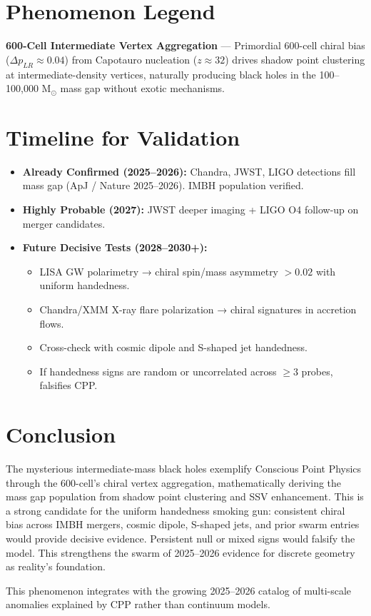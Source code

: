 \documentclass[11pt]{article}
\begin{document}
\section{Phenomenon Legend}
\textbf{600-Cell Intermediate Vertex Aggregation} — Primordial 600-cell chiral bias ($\Delta p_{LR} \approx 0.04$) from Capotauro nucleation ($z \approx 32$) drives shadow point clustering at intermediate-density vertices, naturally producing black holes in the 100–100,000 M$_\odot$ mass gap without exotic mechanisms.

\section{Timeline for Validation}
\begin{itemize}
    \item \textbf{Already Confirmed (2025--2026):} Chandra, JWST, LIGO detections fill mass gap (ApJ / Nature 2025--2026). IMBH population verified.
    \item \textbf{Highly Probable (2027):} JWST deeper imaging + LIGO O4 follow-up on merger candidates.
    \item \textbf{Future Decisive Tests (2028--2030+):}
    \begin{itemize}
        \item LISA GW polarimetry → chiral spin/mass asymmetry $>0.02$ with uniform handedness.
        \item Chandra/XMM X-ray flare polarization → chiral signatures in accretion flows.
        \item Cross-check with cosmic dipole and S-shaped jet handedness.
        \item If handedness signs are random or uncorrelated across $\geq 3$ probes, falsifies CPP.
    \end{itemize}
\end{itemize}

\section{Conclusion}
The mysterious intermediate-mass black holes exemplify Conscious Point Physics through the 600-cell's chiral vertex aggregation, mathematically deriving the mass gap population from shadow point clustering and SSV enhancement. This is a strong candidate for the uniform handedness smoking gun: consistent chiral bias across IMBH mergers, cosmic dipole, S-shaped jets, and prior swarm entries would provide decisive evidence. Persistent null or mixed signs would falsify the model. This strengthens the swarm of 2025--2026 evidence for discrete geometry as reality's foundation.

This phenomenon integrates with the growing 2025--2026 catalog of multi-scale anomalies explained by CPP rather than continuum models.
\end{document}
